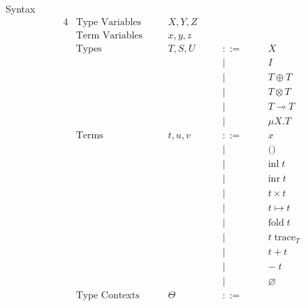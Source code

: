 \documentclass[10pt]{jsarticle}
\newcommand{\bnfdef}{::=}
\begin{document}
\begin{itembox}[c]{Syntax}
  \begin{alignat*}{4}
    &\text{Type Variables}  & \quad &X,Y,Z  & \quad &        & \quad & \\
    &\text{Term Variables}  &       &x,y,z  &       &        &       & \\
    &\text{Types}           &       &T,S,U  &       &\bnfdef &       & X \\
    &                       &       &       &       &|       &       & I \\
    &                       &       &       &       &|       &       & T \oplus T \\
    &                       &       &       &       &|       &       & T \otimes T \\
    &                       &       &       &       &|       &       & T \multimap T \\
    &                       &       &       &       &|       &       & \mu{X}.T \\
    &\text{Terms}           &       &t,u,v  &       &\bnfdef &       & x \\
    &                       &       &       &       &|       &       & \text{()} \\
    &                       &       &       &       &|       &       & \text{inl}\;t \\
    &                       &       &       &       &|       &       & \text{inr}\;t \\
    &                       &       &       &       &|       &       & t\times{}t \\
    &                       &       &       &       &|       &       & t\mapsto{}t \\
    &                       &       &       &       &|       &       & \text{fold}\;t \\
    &                       &       &       &       &|       &       & t\;\text{trace}_T \\
    &                       &       &       &       &|       &       & t+t \\
    &                       &       &       &       &|       &       & -\;t \\
    &                       &       &       &       &|       &       & \varnothing \\
    &\text{Type Contexts}   &       &\Theta &       &\bnfdef &       & \\

\end{alignat*}
\end{itembox}
\end{document}
